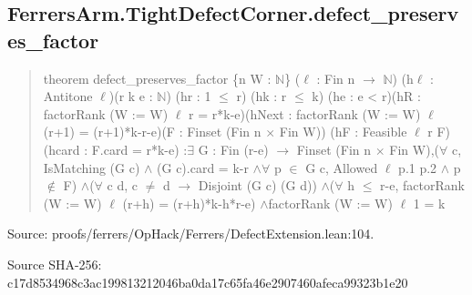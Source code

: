 \documentclass[11pt,a4paper]{article}
\begin{document}
\begin{samepage}
\subsection{FerrersArm.TightDefectCorner.defect\_preserves\_factor}
\begin{quote}\small\ttfamily theorem defect\_preserves\_factor \{n W : \ensuremath{\mathbb{N}}\} (\ensuremath{\ell} : Fin n \ensuremath{\to} \ensuremath{\mathbb{N}}) (h\ensuremath{\ell} : Antitone \ensuremath{\ell})\newline     (r k e : \ensuremath{\mathbb{N}}) (hr : 1 \ensuremath{\leq} r) (hk : r \ensuremath{\leq} k) (he : e < r)\newline     (hR : factorRank (W := W) \ensuremath{\ell} r = r*k-e)\newline     (hNext : factorRank (W := W) \ensuremath{\ell} (r+1) = (r+1)*k-r-e)\newline     (F : Finset (Fin n \ensuremath{\times} Fin W)) (hF : Feasible \ensuremath{\ell} r F) (hcard : F.card = r*k-e) :\newline     \ensuremath{\exists} G : Fin (r-e) \ensuremath{\to} Finset (Fin n \ensuremath{\times} Fin W),\newline       (\ensuremath{\forall} c, IsMatching (G c) \ensuremath{\wedge} (G c).card = k-r \ensuremath{\wedge}\newline         \ensuremath{\forall} p \ensuremath{\in} G c, Allowed \ensuremath{\ell} p.1 p.2 \ensuremath{\wedge} p \ensuremath{\notin} F) \ensuremath{\wedge}\newline       (\ensuremath{\forall} c d, c \ensuremath{\neq} d \ensuremath{\to} Disjoint (G c) (G d)) \ensuremath{\wedge}\newline       (\ensuremath{\forall} h \ensuremath{\leq} r-e, factorRank (W := W) \ensuremath{\ell} (r+h) = (r+h)*k-h*r-e) \ensuremath{\wedge}\newline       factorRank (W := W) \ensuremath{\ell} 1 = k\end{quote}
{\small Source: proofs/ferrers/OpHack/Ferrers/DefectExtension.lean:104.\par}

{\small Source SHA-256: c17d8534968c3ac199813212046ba0da17c65fa46e2907460afeca99323b1e20\par}

\end{samepage}
\end{document}
